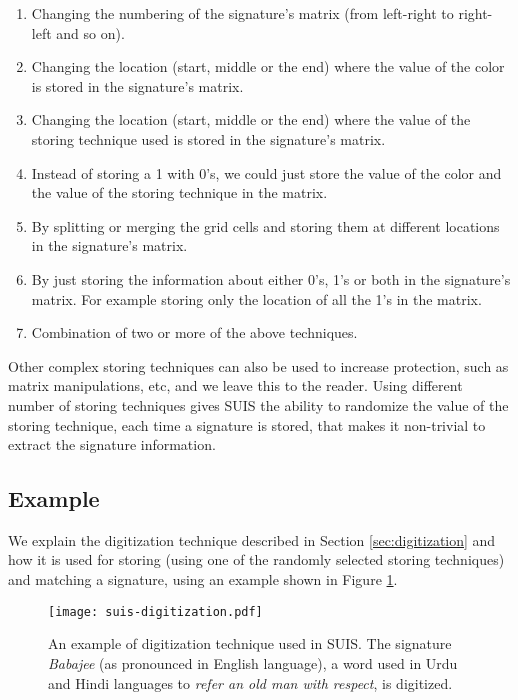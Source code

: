 \documentclass[conference]{IEEEtran}
\begin{document}
\begin{enumerate}
\item
Changing the numbering of the signature's matrix (from left-right to right-left and so on).
\item
Changing the location (start, middle or the end) where the value of the color is stored in the signature's matrix.
\item
Changing the location (start, middle or the end) where the value of the storing technique used is stored in the signature's matrix.
\item
Instead of storing a 1 with 0's, we could just store the value of the color and the value of the storing technique in the matrix.
\item
By splitting or merging the grid cells and storing them at different locations in the signature's matrix.
\item
By just storing the information about either 0's, 1's or both in the signature's matrix. For example storing only the location of all the 1's in the matrix.
\item
Combination of two or more of the above techniques.
\end{enumerate}

Other complex storing techniques can also be used to increase protection, such as matrix manipulations, etc, and we leave this to the reader. Using different number of storing techniques gives SUIS the ability to randomize the value of the storing technique, each time a signature is stored, that makes it non-trivial to extract the signature information.


\subsection{Example}\label{sec:example}

We explain the digitization technique described in Section \ref{sec:digitization} and how it is used for storing (using one of the randomly selected storing techniques) and matching a signature, using an example shown in Figure \ref{fig:suis-digitization}.


\begin{figure}[htbp]
\centering
   {\texttt{[image: suis-digitization.pdf]}}
\caption{An example of digitization technique used in SUIS. The signature \emph{Babajee} (as pronounced in English language), a word used in Urdu and Hindi languages to \emph{refer an old man with respect}, is digitized.}
\label{fig:suis-digitization}
\end{figure}
\end{document}
